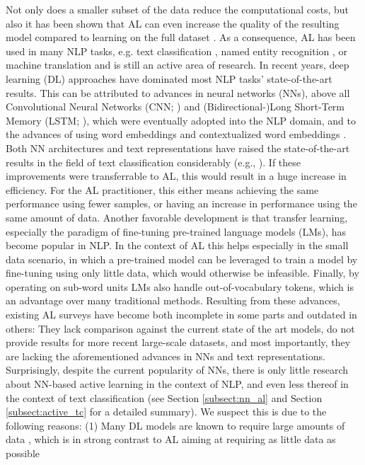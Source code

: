\pindent {}
Not only does a smaller subset of the data reduce the computational costs, 
but also it has been shown that AL can even increase the quality of the resulting model compared to learning on the full dataset .
As a consequence, AL has been used in many NLP tasks, e.g. text classification , named entity recognition , 
or machine translation  and is still an active area of research.
In recent years, deep learning (DL) approaches have dominated most NLP tasks' state-of-the-art results.
This can be attributed to advances in neural networks (NNs), above all Convolutional Neural Networks (CNN; ) and (Bidirectional-)Long Short-Term Memory (LSTM; ),
which were eventually adopted into the NLP domain,
and to the advances of using word embeddings  and contextualized word embeddings .
Both NN architectures and text representations have raised the state-of-the-art results in the field of text classification considerably (e.g., ).
If these improvements were transferrable to AL, this would result in a huge increase in efficiency.
For the AL practitioner, this either means achieving the same performance using fewer samples, or having an increase in performance using the same amount of data.
Another favorable development is that transfer learning, especially the paradigm of fine-tuning pre-trained language models (LMs), has become popular in NLP.
In the context of AL this helps especially in the small data scenario, in which a pre-trained model can be leveraged to train a model by fine-tuning using only little data, which would otherwise be infeasible.
Finally, by operating on sub-word units LMs also handle out-of-vocabulary tokens, which is an advantage over many traditional methods.
Resulting from these advances, existing AL surveys have become both incomplete in some parts and outdated in others:
They lack comparison against the current state of the art models, do not provide results for more recent large-scale datasets, 
and most importantly, they are lacking the aforementioned advances in NNs and text representations.
Surprisingly, despite the current popularity of NNs, there is only little research about NN-based active learning in the context of NLP, and even less thereof in the context of text classification (see Section \ref{subsect:nn_al} and Section \ref{subsect:active_tc} for a detailed summary).
We suspect this is due to the following reasons: 
(1) Many DL models are known to require large amounts of data ,
which is in strong contrast to AL aiming at requiring as little data as possible
